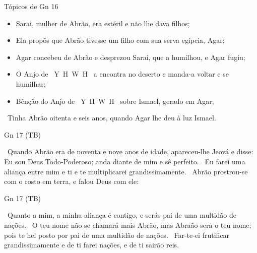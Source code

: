 \documentclass[12pt,aspectratio=169]{beamer}
\newcommand{\YA}{%
    \mbox{%
        Y\makebox[0pt][l]{\hspace{-0.178em}\raisebox{-0.00ex}{\scalebox{0.30}{E}}}%
        H\makebox[0pt][l]{\hspace{-0.010em}\raisebox{-0.00ex}{\scalebox{0.30}{O}}}%
        W\makebox[0pt][l]{\hspace{-0.245em}\raisebox{-0.00ex}{\scalebox{0.30}{A}}}%
        H%
    }%
}
\newcommand{\ver}[1]{%
    \raisebox{0.50ex}{%
        \scalebox{1.1}{%
            \pmb{\textbf{\textcolor{BSpbg}{#1}}}%
        }%
    }%
}
\newcommand{\QUOTE}[1]{%
    \par\noindent\hspace*{0.05\linewidth}%
    \begin{minipage}{0.9\linewidth}%
        \linespread{1.35}\large{#1}%
    \end{minipage}%
}
\newcommand{\YEL}[1]{{\textcolor{TXyel}{#1}}}
\newcommand{\CYA}[1]{{\textcolor{TXcya}{#1}}}
\newcommand{\BLU}[1]{{\textcolor{TXblu}{#1}}}
\newcommand{\MAG}[1]{{\textcolor{TXmag}{#1}}}
\newcommand{\BRI}[1]{{\textcolor{BSpbg}{#1}}}   %
\begin{document}
    \begin{frame}{\YEL{Tópicos de Gn 16}}
        \begin{itemize}
            \item Sarai, mulher de Abrão, era estéril e não lhe dava filhos;
            \item Ela propõs que Abrão tivesse um filho com sua serva egípcia, Agar;
            \item Agar concebeu de Abrão e desprezou Sarai, que a humilhou, e Agar fugiu;
            \item O \BRI{Anjo de \YA} a encontra no deserto e manda-a voltar e se humilhar;
            \item Bênção do \BRI{Anjo de \YA} sobre Ismael, gerado em Agar;
        \end{itemize}

        \vspace{1.5\bigskipamount}

        \QUOTE{
            \ver{16}~Tinha Abrão \YEL{oitenta e seis anos}, quando Agar lhe deu à luz Ismael.
        }
    \end{frame}

    \begin{frame}{\BRI{Gn 17} (TB)}
        \QUOTE{%
            \ver{1}~Quando Abrão era de \YEL{noventa e nove anos} de idade, apareceu-lhe Jeová e
            disse: \CYA{Eu sou Deus Todo-Poderoso}; \MAG{anda diante de mim e sê perfeito}.
            \ver{2}~\BLU{Eu farei} uma \YEL{aliança} entre mim e ti e te \YEL{multiplicarei
            grandissimamente}.
            \ver{3}~Abrão prostrou-se com o rosto em terra, e falou Deus com ele:
        }
    \end{frame}

    \begin{frame}{\BRI{Gn 17} (TB)}
        \QUOTE{%
            \ver{4}~Quanto a mim, a minha aliança é contigo, e serás \YEL{pai de uma multidão de
            nações}.
            \ver{5}~O teu nome não se chamará mais Abrão, mas \YEL{Abraão será o teu nome}; pois
            te hei posto por \YEL{pai de uma multidão de nações}.
            \ver{6}~Far-te-ei frutificar grandissimamente e de ti farei \YEL{nações}, e de ti
            sairão \MAG{reis}.
        }
    \end{frame}
\end{document}
